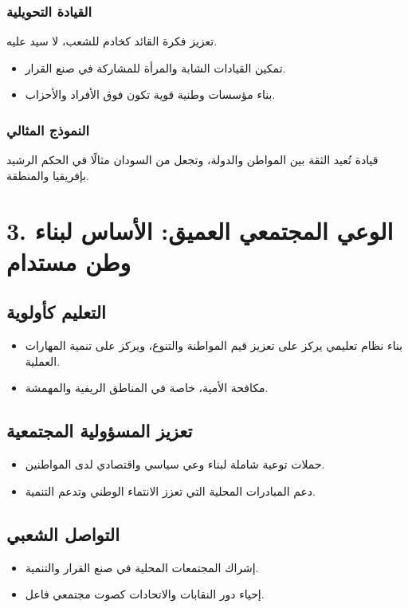 \documentclass[12pt]{article}
\begin{document}
\subsubsection{القيادة التحويلية}
تعزيز فكرة القائد كخادم للشعب، لا سيد عليه.
\begin{itemize}
    \item تمكين القيادات الشابة والمرأة للمشاركة في صنع القرار.
    \item بناء مؤسسات وطنية قوية تكون فوق الأفراد والأحزاب.
\end{itemize}

\subsubsection{النموذج المثالي}
قيادة تُعيد الثقة بين المواطن والدولة، وتجعل من السودان مثالًا في الحكم الرشيد بإفريقيا والمنطقة.



\section{3. الوعي المجتمعي العميق: الأساس لبناء وطن مستدام}
\subsection{التعليم كأولوية}
\begin{itemize}
    \item بناء نظام تعليمي يركز على تعزيز قيم المواطنة والتنوع، ويركز على تنمية المهارات العملية.
    \item مكافحة الأمية، خاصة في المناطق الريفية والمهمشة.
\end{itemize}

\subsection{تعزيز المسؤولية المجتمعية}
\begin{itemize}
    \item حملات توعية شاملة لبناء وعي سياسي واقتصادي لدى المواطنين.
    \item دعم المبادرات المحلية التي تعزز الانتماء الوطني وتدعم التنمية.
\end{itemize}

\subsection{التواصل الشعبي}
\begin{itemize}
    \item إشراك المجتمعات المحلية في صنع القرار والتنمية.
    \item إحياء دور النقابات والاتحادات كصوت مجتمعي فاعل.
\end{itemize}
\end{document}
